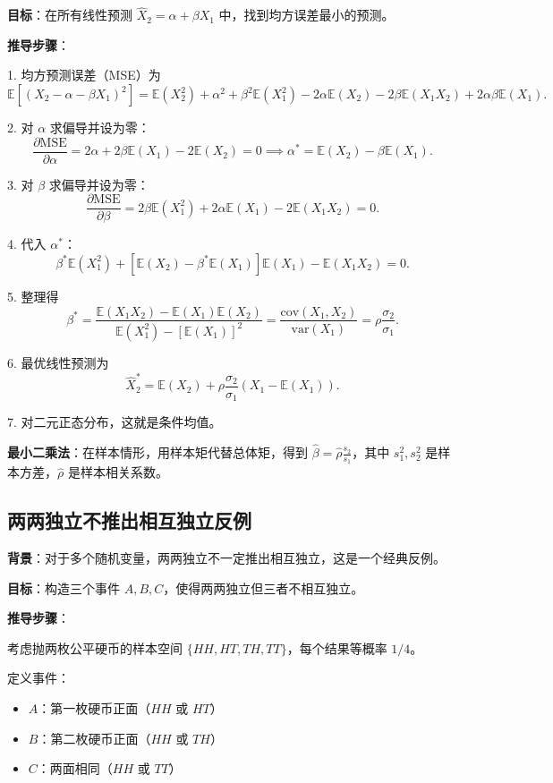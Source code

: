 \textbf{目标}：在所有线性预测 $\widehat{X}_2 = \alpha + \beta X_1$ 中，找到均方误差最小的预测。

\textbf{推导步骤}：

1. 均方预测误差（MSE）为
\[
\mathbb{E}[(X_2 - \alpha - \beta X_1)^2] = \mathbb{E}(X_2^2) + \alpha^2 + \beta^2 \mathbb{E}(X_1^2) - 2\alpha\mathbb{E}(X_2) - 2\beta\mathbb{E}(X_1 X_2) + 2\alpha\beta\mathbb{E}(X_1).
\]

2. 对 $\alpha$ 求偏导并设为零：
\[
\frac{\partial \text{MSE}}{\partial \alpha} = 2\alpha + 2\beta\mathbb{E}(X_1) - 2\mathbb{E}(X_2) = 0 \implies \alpha^* = \mathbb{E}(X_2) - \beta \mathbb{E}(X_1).
\]

3. 对 $\beta$ 求偏导并设为零：
\[
\frac{\partial \text{MSE}}{\partial \beta} = 2\beta\mathbb{E}(X_1^2) + 2\alpha\mathbb{E}(X_1) - 2\mathbb{E}(X_1 X_2) = 0.
\]

4. 代入 $\alpha^*$：
\[
\beta^*\mathbb{E}(X_1^2) + [\mathbb{E}(X_2) - \beta^*\mathbb{E}(X_1)]\mathbb{E}(X_1) - \mathbb{E}(X_1 X_2) = 0.
\]

5. 整理得
\[
\beta^* = \frac{\mathbb{E}(X_1 X_2) - \mathbb{E}(X_1)\mathbb{E}(X_2)}{\mathbb{E}(X_1^2) - [\mathbb{E}(X_1)]^2} = \frac{\text{cov}(X_1, X_2)}{\text{var}(X_1)} = \rho \frac{\sigma_2}{\sigma_1}.
\]

6. 最优线性预测为
\[
\widehat{X}_2^* = \mathbb{E}(X_2) + \rho\frac{\sigma_2}{\sigma_1}(X_1 - \mathbb{E}(X_1)).
\]

7. 对二元正态分布，这就是条件均值。

\textbf{最小二乘法}：在样本情形，用样本矩代替总体矩，得到 $\widehat{\beta} = \widehat{\rho} \frac{s_2}{s_1}$，其中 $s_1^2, s_2^2$ 是样本方差，$\widehat{\rho}$ 是样本相关系数。

\subsection{两两独立不推出相互独立反例}\label{sec:derivation-ch2-pairwise-not-mutual}

\textbf{背景}：对于多个随机变量，两两独立不一定推出相互独立，这是一个经典反例。

\textbf{目标}：构造三个事件 $A, B, C$，使得两两独立但三者不相互独立。

\textbf{推导步骤}：

考虑抛两枚公平硬币的样本空间 $\{HH, HT, TH, TT\}$，每个结果等概率 $1/4$。

定义事件：
\begin{itemize}
\item $A$：第一枚硬币正面（$HH$ 或 $HT$）
\item $B$：第二枚硬币正面（$HH$ 或 $TH$）
\item $C$：两面相同（$HH$ 或 $TT$）
\end{itemize}

